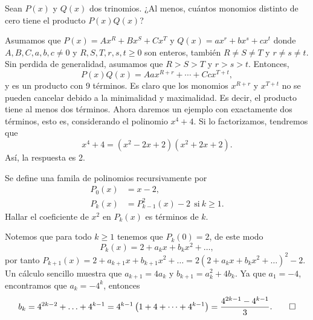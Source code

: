 \begin{example}
    Sean $P(x)$ y $Q(x)$ dos trinomios.
    ¿Al menos, cuántos monomios distinto de cero tiene el producto $P(x) Q(x)$?
\end{example}
\begin{solution}
    Asumamos que $P(x) = Ax^R + Bx^S + Cx^T$ y $Q(x) = ax^r + bx^s + cx^t$
    donde $A, B, C, a, b,c \neq 0$ y $R, S, T, r, s, t \geq 0$ son enteros, también $R \neq S \neq T$ y $r \neq s \neq t$.
    Sin perdida de generalidad, asumamos que $R > S > T$ y $r > s > t$.
    Entonces,
    \[
        P(x) Q(x) = Aax^{R + r} + \cdots + Ccx^{T + t},
    \]
    y es un producto con 9 términos.
    Es claro que los monomios $x^{R + r}$ y $x^{T + t}$ no se pueden cancelar debido a la minimalidad y maximalidad.
    Es decir, el producto tiene al menos dos términos.
    Ahora daremos un ejemplo con exactamente dos términos, esto es, considerando el polinomio $x^4 + 4$.
    Si lo factorizamos, tendremos que
    \[
        x^4 + 4 = (x^2 - 2x + 2)(x^2 + 2x + 2).
    \]
    Así, la respuesta es 2.
\end{solution}

\begin{example}
    Se define una famila de polinomios recursivamente por
    \begin{align*}
        P_0(x) &= x - 2,\\
        P_k(x) &= P_{k - 1}^2(x) - 2 \ \ \text{si} \ k \geq 1.
    \end{align*}
    Hallar el coeficiente de $x^2$ en $P_k(x)$ es términos de $k$.
\end{example}
\begin{solution}
    Notemos que para todo $k \geq 1$ tenemos que $P_k(0) = 2$, de este modo
    \[
        P_k(x) = 2 + a_k x + b_k x^2 + \ldots,
    \]
    por tanto $P_{k + 1}(x) = 2 + a_{k + 1}x + b_{k + 1} x^2 + \ldots = 2(2 + a_k x + b_k x^2 + \ldots)^2 - 2.$
    Un cálculo sencillo muestra que $a_{k + 1} = 4a_k$ y $b_{k + 1} = a_k^2 + 4b_k$.
    Ya que $a_1 = -4$, encontramos que $a_k = -4^k$, entonces
    \[
        b_k = 4^{2k - 2} + \ldots + 4^{k - 1} = 4^{k - 1}\left(1 + 4 + \cdots + 4^{k - 1}\right) = \frac{4^{2k - 1} - 4^{k - 1}}{3}. \qedhere
    \]
\end{solution}

